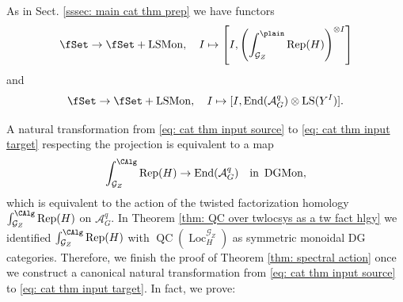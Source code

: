 \documentclass[10pt]{amsart}
\theoremstyle{remark}
\newcommand{\te}{\text}
\newcommand{\on}{\operatorname}
\newcommand{\cA}{\mathcal{A}}
\newcommand{\cG}{\mathcal{G}}
\newcommand{\LSMon}{\on{LSMon}}
\newcommand{\DGCatMon}{\on{DGMon}}
\newcommand{\Rep}{\on{Rep}}
\newcommand{\QC}{\on{QC}}
\newcommand{\Loc}{\on{Loc}}
\newcommand{\LS}{\on{LS}}
\DeclareMathOperator{\End}{End}
\begin{document}
As in Sect. \ref{sssec: main cat thm prep} we have functors
\begin{equation}\label{eq: cat thm input source}
    \fSet\rightarrow\fSet+\LSMon,\quad I\mapsto \left[I,\left(\int^{\plain}_{\cG_Z}\Rep(H)\right)^{\otimes I}\right]
\end{equation}
and 
\begin{equation}\label{eq: cat thm input target}
    \fSet\rightarrow\fSet+\LSMon,\quad I\mapsto [I, \End(\cA^q_G)\otimes\LS(Y^I)].
\end{equation}

A natural transformation from \eqref{eq: cat thm input source} to \eqref{eq: cat thm input target} respecting the projection is equivalent to a map
\[\int^{\CAlg}_{\cG_Z}\Rep(H)\rightarrow \End(\cA^q_G)\quad\te{in }\DGCatMon,\]
which is equivalent to the action of the twisted factorization homology $\int^{\CAlg}_{\cG_Z}\Rep(H)$ on $\cA^q_G$. In Theorem \ref{thm: QC over twlocsys as a tw fact hlgy} we identified $\int^{\CAlg}_{\cG_Z}\Rep(H)$ with $\QC(\Loc^{\cG_Z}_H)$ as symmetric monoidal DG categories. Therefore, we finish the proof of Theorem \ref{thm: spectral action} once we construct a canonical natural transformation from \eqref{eq: cat thm input source} to \eqref{eq: cat thm input target}. In fact, we prove:
\end{document}
